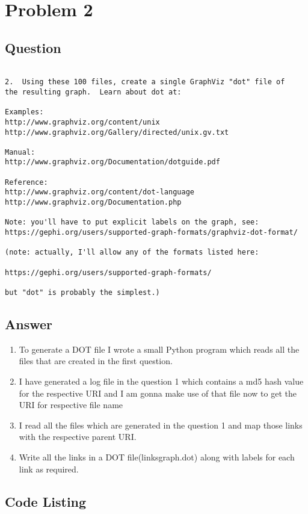 \section{Problem 2}
\label{part2}
\subsection*{Question}
\begingroup
\begin{verbatim}

2.  Using these 100 files, create a single GraphViz "dot" file of
the resulting graph.  Learn about dot at:

Examples:
http://www.graphviz.org/content/unix
http://www.graphviz.org/Gallery/directed/unix.gv.txt

Manual:
http://www.graphviz.org/Documentation/dotguide.pdf

Reference:
http://www.graphviz.org/content/dot-language
http://www.graphviz.org/Documentation.php

Note: you'll have to put explicit labels on the graph, see:
https://gephi.org/users/supported-graph-formats/graphviz-dot-format/

(note: actually, I'll allow any of the formats listed here:

https://gephi.org/users/supported-graph-formats/

but "dot" is probably the simplest.)

\end{verbatim}
\newpage
\subsection{Answer}
\begin{enumerate}
\item To generate a DOT file I wrote a small Python program which reads all the files that are created in the first question.
\item I have generated a log file in the question 1 which contains a md5 hash value for the respective URI and I am gonna make use of that file now to get the URI for respective file name
\item I read all the files which are generated in the question 1 and map those links with the respective parent URI.
\item Write all the links in a DOT file(linksgraph.dot) along with labels for each link as required.
\end{enumerate}
\subsection{Code Listing}
